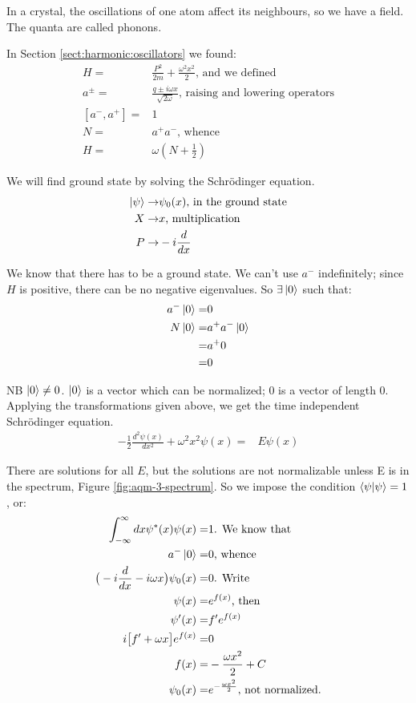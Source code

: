 \documentclass[]{article}
\begin{document}
In a crystal, the oscillations of one atom affect its neighbours, so we have a field. The quanta are called phonons.

In Section \ref{sect:harmonic:oscillators} we found:
\begin{align*}
	H =& \frac{P^2}{2m} + \frac{\omega^2 x^2}{2} \text{, and we defined}\\
	a^\pm=& \frac{q \pm i \omega x}{\sqrt{2 \omega}} \text{, raising and lowering operators}\\
	[a^-,a^+]=& 1\\
	N =& a^+a^- \text{, whence}\\
	H =& \omega(N+\frac{1}{2})
\end{align*}

We will find ground state by solving the Schr\"odinger equation.
\begin{align*}
	\ket{\psi} \rightarrow& \psi_0(x) \text{, in the ground state}\\
	X \rightarrow& x \text{, multiplication}\\
	P \rightarrow& -i \frac{d}{dx}
\end{align*}


We know that there has to be a ground state. We can't use $a^-$ indefinitely; since $H$ is positive, there can be no negative eigenvalues. So $\exists \ket{0}$ such that: 
\begin{align*}
	a^-\ket{0}=&0\\
	N\ket{0}=&a^+a^- \ket{0 }\\
	=& a^+0\\
	=&0
\end{align*}

NB $\ket{0} \ne 0$. $\ket{0}$ is a vector which can be normalized; $0$ is a vector of length 0.
Applying the transformations given above, we get the time independent Schr\"odinger equation.
\begin{align*}
	-\frac{1}{2}\frac{d^2 \psi(x)}{dx^2} + \omega^2 x^2 \psi(x)=& E\psi(x)
\end{align*}

 There are solutions for all $E$, but the solutions are not normalizable unless E is in the spectrum, Figure \ref{fig:aqm-3-spectrum}. So we impose the condition $\braket{\psi|\psi}=1$, or:
\begin{align*}
	\int_{-\infty}^{\infty} dx \psi^*(x) \psi(x) =& 1 \text{. We know that}\\
	a^-\ket{0}=& 0 \text{, whence}\\
	\big(-i \frac{d}{dx} - i \omega x \big)\psi_0(x) =& 0 \text{. Write}\\
	\psi(x)=&e^{f(x)} \text{, then}\\
	\psi^\prime(x) =&f^\prime e^{f(x)}\\
	i \big[f^\prime  + \omega x\big]e^{f(x)} =&0\\
	f(x) =& -\frac{\omega x^2}{2}+C\\
	\psi_0(x) =& e^{-\frac{\omega x^2}{2}} \text{, not normalized.}
\end{align*}
\end{document}
